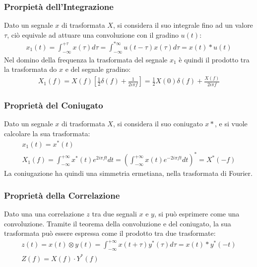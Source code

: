 \documentclass{article}
\numberwithin{equation}{subsection}
\begin{document}
\subsubsection{Prorpietà dell'Integrazione}

Dato un segnale $x$ di trasformata $X$, si considera il suo integrale fino ad un valore $\tau$, ciò equivale ad attuare una convoluzione con il gradino $u(t)$:
\begin{gather*}
    x_1(t)=\displaystyle\int_{-\infty}^{+\tau}x(\tau)d\tau=\int_{-\infty}^{*\infty}u(t-\tau)x(\tau)d\tau=x(t)*u(t)
\end{gather*}
Nel domino della frequenza la trasformata del segnale $x_1$ è quindi il prodotto tra la trasformata do $x$ e del segnale gradino:
\begin{gather*}
    X_1(f)=X(f)\left[\displaystyle\frac{1}{2}\delta(f)+\frac{1}{2i\pi f}\right]=\frac{1}{2}X(0)\delta(f)+\frac{X(f)}{2i\pi f}
\end{gather*}

\subsubsection{Proprietà del Coniugato}

Dato un segnale $x$ di trasformata $X$, si considera il suo coniugato $x*$, e si vuole calcolare la sua trasformata:
\begin{gather*}
    x_1(t)=x^*(t)\\
    X_1(f)=\displaystyle\int_{-\infty}^{+\infty}x^*(t)e^{2i\pi ft}dt=\left(\int_{-\infty}^{+\infty}x(t)e^{-2i\pi ft}dt\right)^*=X^*(-f)
\end{gather*}
La coniugazione ha quindi una simmetria ermetiana, nella trasformata di Fourier. 

\subsubsection{Proprietà della Correlazione}

Dato una una correlazione $z$ tra due segnali $x$ e $y$, si può esprimere come una convoluzione. Tramite il teorema della convoluzione e del coniugato, la sua trasformata può 
essere espressa come il prodotto tra due trasformate: 
\begin{gather*}
    z(t)=x(t)\otimes y(t)=\displaystyle\int_{-\infty}^{+\infty}x(t+\tau)y^*(\tau)d\tau=x(t)*y^*(-t)\\
    Z(f)=X(f)\cdot Y^*(f)
\end{gather*}
\end{document}
